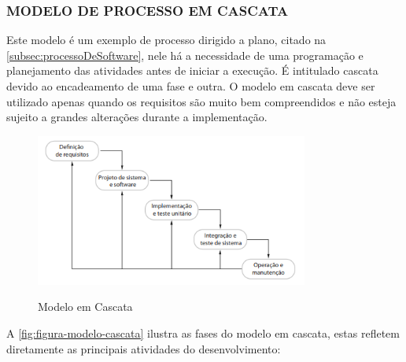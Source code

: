 \subsubsection{MODELO DE PROCESSO EM CASCATA}
\label{subsubsec:modeloCascata}
Este modelo é um exemplo de processo dirigido a plano, citado na \autoref{subsec:processoDeSoftware}, nele há a necessidade de uma programação e planejamento das atividades antes de iniciar a execução. É intitulado cascata devido ao encadeamento de uma fase e outra. O modelo em cascata deve ser utilizado apenas quando os requisitos são muito bem compreendidos e não esteja sujeito a grandes alterações durante a implementação. 

\begin{figure}[!htb]
    \centering
    \caption{Modelo em Cascata}
    \includegraphics[width=0.8\textwidth]{./dados/figuras/modeloEmCascata}
    \label{fig:figura-modelo-cascata}
\end{figure}

A \autoref{fig:figura-modelo-cascata} ilustra as fases do modelo em cascata, estas refletem diretamente as principais atividades do desenvolvimento:

